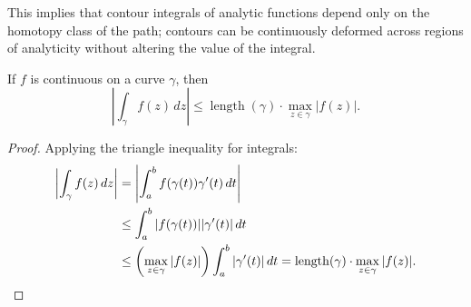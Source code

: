 This implies that contour integrals of analytic functions depend only on the homotopy class of the path; contours can be continuously deformed across regions of analyticity without altering the value of the integral.

\begin{proposition}
    If \(f\) is continuous on a curve \(\gamma\), then
    \[
        \left| \int_\gamma f(z) \, dz \right| \le \operatorname{length}(\gamma) \cdot \max_{z \in \gamma} |f(z)|.
    \]
\end{proposition}

\begin{proof}
    Applying the triangle inequality for integrals:
    \begin{align*}
        \left| \int_\gamma f(z) \, dz \right|
        &= \left| \int_a^b f(\gamma(t)) \gamma'(t) \, dt \right| \\
        &\le \int_a^b |f(\gamma(t))| |\gamma'(t)| \, dt \\
        &\le \left( \max_{z \in \gamma} |f(z)| \right) \int_a^b |\gamma'(t)| \, dt = \operatorname{length}(\gamma) \cdot \max_{z \in \gamma} |f(z)|. \qedhere
    \end{align*}
\end{proof}